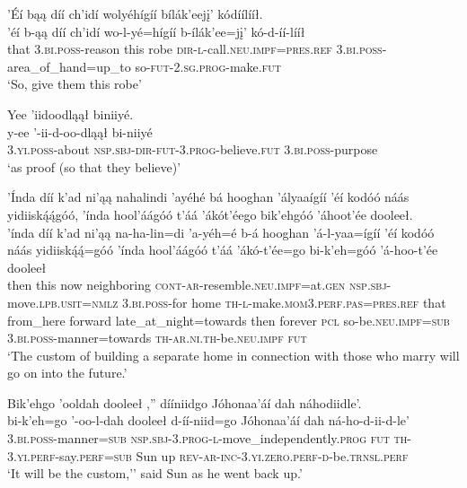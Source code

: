 \ea\label{ex:text5-9-2}
’Éí bąą díí ch’idí wolyéhígíí bílák’eejį’ kódíílííł.\\
\gll ’éí	b-ąą	díí	ch’idí	wo-l-yé=hígíí	b-ílák’ee=jį’	kó-d-íí-lííł\\
     that	3.\textsc{bi}.\textsc{poss}-reason	this	robe	\textsc{dir}-\textsc{l}-call.\textsc{neu}.\textsc{impf}=\textsc{pres}.\textsc{ref}	3.\textsc{bi}.\textsc{poss}-area\_of\_hand=up\_to	so-\textsc{fut}-2.\textsc{sg}.\textsc{prog}-make.\textsc{fut}\\
\glt `So, give them this robe'
\z

\ea\label{ex:text5-9-3}
Yee ’iidoodląął biniiyé.\\
\gll y-ee	’-ii-d-oo-dląął	bi-niiyé\\
     3.\textsc{yi}.\textsc{poss}-about	\textsc{nsp}.\textsc{sbj}-\textsc{dir}-\textsc{fut}-3.\textsc{prog}-believe.\textsc{fut}	3.\textsc{bi}.\textsc{poss}-purpose\\
\glt `as proof (so that they believe)'
\z

\ea\label{ex:text5-9-4}
’Índa díí k’ad ni’ąą nahalindi ’ayéhé bá hooghan ’ályaaígíí ’éí kodóó náás yidiiską́ą́góó, ’índa hool’áágóó t’áá ’ákót’éego bik’ehgóó ’áhoot’ée dooleeł.\\
\gll ’índa	díí	k’ad	ni’ąą	na-ha-lin=di	’a-yéh=é	b-á	hooghan	’á-l-yaa=ígíí	’éí	kodóó	náás	yidiiską́ą́=góó	’índa	hool’áágóó	t’áá	’ákó-t’ée=go	bi-k’eh=góó	’á-hoo-t’ée	dooleeł\\
     then	this	now	neighboring	\textsc{cont}-\textsc{ar}-resemble.\textsc{neu}.\textsc{impf}=at.\textsc{gen}	\textsc{nsp}.\textsc{sbj}-move.\textsc{lpb}.\textsc{usit}=\textsc{nmlz}	3.\textsc{bi}.\textsc{poss}-for	home	\textsc{th}-\textsc{l}-make.\textsc{mom}3.\textsc{perf}.\textsc{pas}=\textsc{pres}.\textsc{ref}	that	from\_here	forward	late\_at\_night=towards	then	forever	\textsc{pcl}	so-be.\textsc{neu}.\textsc{impf}=\textsc{sub}	3.\textsc{bi}.\textsc{poss}-manner=towards	\textsc{th}-\textsc{ar}.\textsc{ni}.\textsc{th}-be.\textsc{neu}.\textsc{impf}	\textsc{fut}\\
\glt `The custom of building a separate home in connection with those who marry will go on into the future.'
\z

\ea\label{ex:text5-9-5}
Bik’ehgo ’ooldah dooleeł ,'' dííniidgo Jóhonaa’áí dah náhodiidle’.\\
\gll bi-k’eh=go	’-oo-l-dah	dooleeł	d-íí-niid=go	Jóhonaa’áí	dah	ná-ho-d-ii-d-le’\\
     3.\textsc{bi}.\textsc{poss}-manner=\textsc{sub}	\textsc{nsp}.\textsc{sbj}-3.\textsc{prog}-\textsc{l}-move\_independently.\textsc{prog}	\textsc{fut}	\textsc{th}-3.\textsc{yi}.\textsc{perf}-say.\textsc{perf}=\textsc{sub}	Sun	up	\textsc{rev}-\textsc{ar}-\textsc{inc}-3.\textsc{yi}.\textsc{zero}.\textsc{perf}-\textsc{d}-be.\textsc{trnsl}.\textsc{perf}\\
\glt `It will be the custom,'' said Sun as he went back up.'
\z


